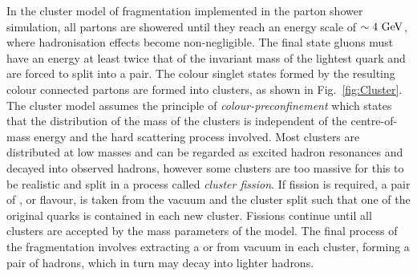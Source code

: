 In the cluster model of fragmentation implemented in the \herwig{} parton shower simulation, all partons are showered until they reach an energy scale of $\sim4\mathrm{~Ge\hspace{-.08em}V}^{}$, where hadronisation effects become non-negligible.
The final state gluons must have an energy at least twice that of the invariant mass of the lightest quark and are forced to split into a \qqbar{} pair.
The colour singlet states formed by the resulting colour connected partons are formed into clusters, as shown in Fig.~\ref{fig:Cluster}.
The cluster model assumes the principle of \textit{colour-preconfinement} which states that the distribution of the mass of the clusters is independent of the centre-of-mass energy and the hard scattering process involved.
Most clusters are distributed at low masses and can be regarded as excited hadron resonances and decayed into observed hadrons, however some clusters are too massive for this to be realistic and split in a process called \textit{cluster fission}.
If fission is required, a \qqbar{} pair of \uquark{}, \dquark{} or \squark{} flavour, is taken from the vacuum and the cluster split such that one of the original quarks is contained in each new cluster.
Fissions continue until all clusters are accepted by the mass parameters of the model.
The final process of the fragmentation involves extracting a \qqbar{} or \qqqbarqbar{} from vacuum in each cluster, forming a pair of hadrons, which in turn may decay into lighter hadrons.

